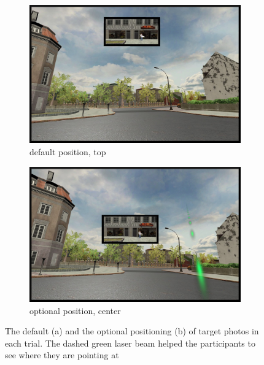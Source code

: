 \begin{figure}[!htb]
	\centering
	\begin{subfigure}[b]{0.48\linewidth}
		\includegraphics[width=\linewidth]{figures/photo_position_top.jpg}
		\caption{default position, top}
		\label{fig:photo_position_top}
	\end{subfigure}
	\begin{subfigure}[b]{0.48\linewidth}
		\includegraphics[width=\linewidth]{figures/photo_position_center.jpg}
		\caption{optional position, center}
		\label{fig:photo_position_center}
	\end{subfigure}
	
	\caption[Trial's target photo positions]{The default (a) and the optional positioning (b) of target photos in each trial. The dashed green laser beam helped the participants to see where they are pointing at
	}
	\label{fig:photo_positions}
\end{figure}

